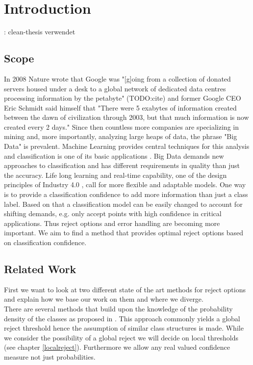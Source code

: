 %
\chapter{Introduction}
\label{sec:intro}
\TODO: clean-thesis verwendet

\section{Scope}
In 2008 Nature wrote that Google was "[g]oing from a collection of donated servers housed under a desk to a global network of dedicated data centres processing information by the petabyte" (TODO:cite) and former Google CEO Eric Schmidt said himself that "There were 5 exabytes of information created between the dawn of civilization through 2003, but that much information is now created every 2 days." Since then countless more companies are specializing in mining and, more importantly, analyzing large heaps of data, the phrase "Big Data" is prevalent. Machine Learning provides central techniques for this analysis and classification is one of its basic applications \cite[p. 5]{Alp:2010}. Big Data demands new approaches to classification and has different requirements in quality than just the accuracy. Life long learning \cite[p. 3]{Sut:2014} and real-time capability, one of the design principles of Industry 4.0 \cite[p. 12]{Her:2015}, call for more flexible and adaptable models. One way is to provide a classification confidence \cite{Del:2005} to add more information than just a class label. Based on that a classification model can be easily changed to account for shifting demands, e.g. only accept points with high confidence in critical applications. Thus reject options and error handling are becoming more important. We aim to find a method that provides optimal reject options based on classification confidence.

\section{Related Work}
First we want to look at two different state of the art methods for reject options and explain how we base our work on them and where we diverge. \\
There are several methods that build upon the knowledge of the probability density of the classes as proposed in \cite{Cho:1970}. This approach commonly yields a global reject threshold hence the assumption of similar class structures is made. While we consider the possibility of a global reject we will decide on local thresholds (see chapter \ref{localreject}). Furthermore we allow any real valued confidence measure not just probabilities. 

